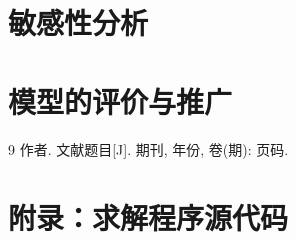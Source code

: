 \documentclass[UTF8,zihao=-4]{ctexart}
\begin{document}
\section{敏感性分析}

\section{模型的评价与推广}

\begin{thebibliography}{9}
   作者. 文献题目[J]. 期刊, 年份, 卷(期): 页码.
\end{thebibliography}

\newpage
\appendix
\section{附录：求解程序源代码}
\end{document}

